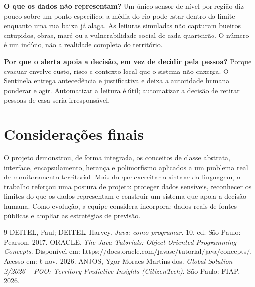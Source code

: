 \documentclass[12pt,a4paper]{article}
\begin{document}
\textbf{O que os dados não representam?} Um único sensor de nível por região diz pouco sobre um ponto específico: a média do rio pode estar dentro do limite enquanto uma rua baixa já alaga. As leituras simuladas não capturam bueiros entupidos, obras, maré ou a vulnerabilidade social de cada quarteirão. O número é um indício, não a realidade completa do território.

\textbf{Por que o alerta apoia a decisão, em vez de decidir pela pessoa?} Porque evacuar envolve custo, risco e contexto local que o sistema não enxerga. O Sentinela entrega antecedência e justificativa e deixa a autoridade humana ponderar e agir. Automatizar a leitura é útil; automatizar a decisão de retirar pessoas de casa seria irresponsável.

\section{Considerações finais}

O projeto demonstrou, de forma integrada, os conceitos de classe abstrata, interface, encapsulamento, herança e polimorfismo aplicados a um problema real de monitoramento territorial. Mais do que exercitar a sintaxe da linguagem, o trabalho reforçou uma postura de projeto: proteger dados sensíveis, reconhecer os limites do que os dados representam e construir um sistema que apoia a decisão humana. Como evolução, a equipe considera incorporar dados reais de fontes públicas e ampliar as estratégias de previsão.

\begin{thebibliography}{9}
 DEITEL, Paul; DEITEL, Harvey. \textit{Java: como programar}. 10. ed. São Paulo: Pearson, 2017.
 ORACLE. \textit{The Java Tutorials: Object-Oriented Programming Concepts}. Disponível em: https://docs.oracle.com/javase/tutorial/java/concepts/. Acesso em: 6 nov. 2026.
 ANJOS, Ygor Moraes Martins dos. \textit{Global Solution 2/2026 -- POO: Territory Predictive Insights (CitizenTech)}. São Paulo: FIAP, 2026.
\end{thebibliography}
\end{document}
